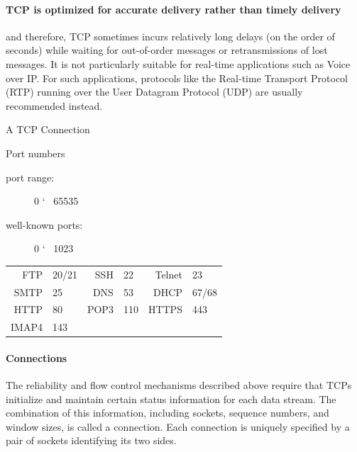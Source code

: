 \paragraph{TCP is optimized for accurate delivery rather than timely delivery}

and therefore, TCP sometimes incurs relatively long delays (on the order of seconds) while
waiting for out-of-order messages or retransmissions of lost messages. It is not
particularly suitable for real-time applications such as Voice over IP. For such
applications, protocols like the Real-time Transport Protocol (RTP) running over the User
Datagram Protocol (UDP) are usually recommended instead. 

\begin{frame}{A TCP Connection}
  \begin{center}
     
  \end{center}
  \begin{iblock}{Port numbers}
    \begin{description}
    \item[port range:] 0 \char`~{} 65535
    \item[well-known ports:] 0 \char`~{} 1023
    \end{description}
    \begin{center}
      \begin{tabular}{rl|rl|rl}
        FTP &20/21&SSH&22&Telnet&23\\
        SMTP&25 &DNS&53&DHCP &67/68\\
        HTTP&80 &POP3&110&HTTPS&443\\
        IMAP4&143&&&&
      \end{tabular}
    \end{center}
  \end{iblock}
\end{frame}

\paragraph{Connections}

  The reliability and flow control mechanisms described above require that TCPs initialize
  and maintain certain status information for each data stream.  The combination of this
  information, including sockets, sequence numbers, and window sizes, is called a
  connection.  Each connection is uniquely specified by a pair of sockets identifying its
  two sides. 

